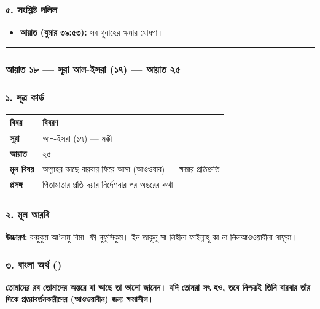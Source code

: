 \subsubsection*{৫. সংশ্লিষ্ট দলিল}

\begin{itemize}
\item \textbf{আয়াত (যুমার ৩৯:৫৩):} সব গুনাহের ক্ষমার ঘোষণা।
\end{itemize}
\medskip\hrule\medskip

\subsubsection*{আয়াত ১৮ — সূরা আল-ইসরা (১৭) — আয়াত ২৫}

\subsubsection*{১. সূত্র কার্ড}

\begin{table}[h]\centering\small
\begin{tabular}{ll}
বিষয় & বিবরণ \\
\hline
\textbf{সূরা} & আল-ইসরা (১৭) — মক্কী \\
\textbf{আয়াত} & ২৫ \\
\textbf{মূল বিষয়} & আল্লাহর কাছে বারবার ফিরে আসা (আওওয়াব) — ক্ষমার প্রতিশ্রুতি \\
\textbf{প্রসঙ্গ} & পিতামাতার প্রতি দয়ার নির্দেশনার পর অন্তরের কথা \\
\hline
\end{tabular}
\end{table}

\subsubsection*{২. মূল আরবি}

\begin{center}\end{center}
\textbf{উচ্চারণ:} রব্বুকুম আ'লামু বিমা- ফী নুফূসিকুম। ইন তাকূনূ সা-লিহীনা ফাইন্নাহু কা-না লিলআওওয়াবীনা গাফূরা।

\subsubsection*{৩. বাংলা অর্থ ()}

\textbf{তোমাদের রব তোমাদের অন্তরে যা আছে তা ভালো জানেন। যদি তোমরা সৎ হও, তবে নিশ্চয়ই তিনি বারবার তাঁর দিকে প্রত্যাবর্তনকারীদের (আওওয়াবীন) জন্য ক্ষমাশীল।}

